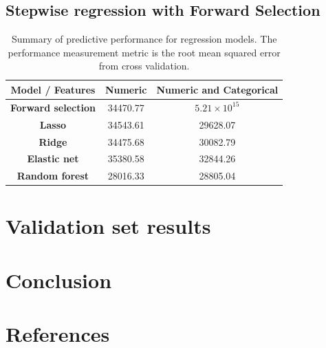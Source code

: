 \documentclass[letterpaper,12pt,twoside,]{pinp}
\begin{document}
\hypertarget{stepwise-regression-with-forward-selection}{%
\subsection{Stepwise regression with Forward
Selection}\label{stepwise-regression-with-forward-selection}}

\begin{table}
\begin{tabular}{ |c|c|c| } 
\hline
\textbf{Model / Features} & \textbf{Numeric} & \textbf{Numeric and Categorical} \\
\hline
\textbf{Forward selection} & 34470.77 & $5.21\times 10^{15}$ \\ 
\textbf{Lasso} & 34543.61 & 29628.07 \\
\textbf{Ridge} & 34475.68 & 30082.79 \\
\textbf{Elastic net} & 35380.58 & 32844.26 \\
\textbf{Random forest} & 28016.33 & 28805.04\\
\hline
\end{tabular}
\centering
\caption{Summary of predictive performance for regression models. The performance measurement metric is the root mean squared error from cross validation.}
\label{table:cv_errors}
\end{table}

\hypertarget{validation-set-results}{%
\section{Validation set results}\label{validation-set-results}}

\hypertarget{conclusion}{%
\section{Conclusion}\label{conclusion}}

\hypertarget{references}{%
\section{References}\label{references}}
\end{document}
